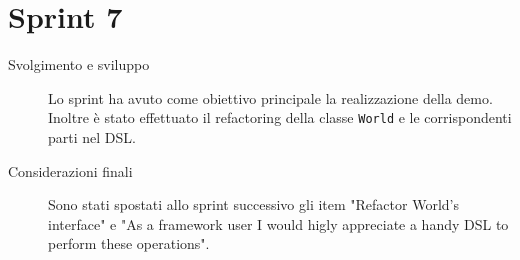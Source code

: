 \section{Sprint 7}\label{sec:sprint-7}
\begin{description}
    \item[Svolgimento e sviluppo] Lo sprint ha avuto come obiettivo principale la realizzazione della demo.
    Inoltre è stato effettuato il refactoring della classe \texttt{World} e le corrispondenti parti nel DSL\@.
    \item[Considerazioni finali] Sono stati spostati allo sprint successivo gli item "Refactor World's interface" e "As a framework user I would higly appreciate a handy DSL to perform these operations".
\end{description}